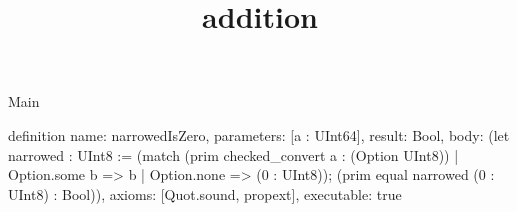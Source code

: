 \begin{lexlean}{Main}
\title{addition}
\begin{semanticmodule}
definition{
  name: narrowedIsZero,
  parameters: [a : UInt64],
  result: Bool,
  body: (let narrowed : UInt8 := (match (prim checked_convert a : (Option UInt8))
    | Option.some b => b
    | Option.none => (0 : UInt8)); (prim equal narrowed (0 : UInt8) : Bool)),
  axioms: [Quot.sound, propext],
  executable: true
}
\end{semanticmodule}
\end{lexlean}

